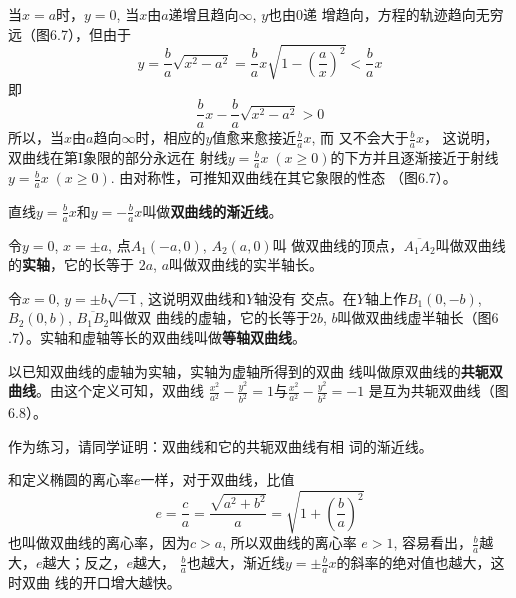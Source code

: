 当$x=a$时，$y=0$, 当$x$由$a$递增且趋向$\infty$, $y$也由0递
增趋向，方程的轨迹趋向无穷远（图6.7），但由于
\[y=\frac{b}{a}\sqrt{x^2-a^2}=\frac{b}{a}x\sqrt{1-\left(\frac{a}{x}\right)^2}<\frac{b}{a}x\]
即
\[\frac{b}{a}x-\frac{b}{a}\sqrt{x^2-a^2}>0\]
所以，当$x$由$a$趋向$\infty$时，相应的$y$值愈来愈接近$\frac{b}{a}x$, 而
又不会大于$\frac{b}{a}x$，
这说明，双曲线在第I象限的部分永远在
射线$y=\frac{b}{a}x\; (x\ge 0)$的下方并且逐渐接近于射线$y=\frac{b}{a}x\; (x\ge 0)$. 由对称性，可推知双曲线在其它象限的性态
（图6.7）。

直线$y=\frac{b}{a}x$和$y=-\frac{b}{a}x$叫做\textbf{双曲线的渐近线}。

令$y=0$, $x=\pm a$, 点$A_1(-a,0)$, $A_2(a,0)$叫
做双曲线的顶点，$\overline{A_1A_2}$叫做双曲线的\textbf{实轴}，它的长等于
$2a$, $a$叫做双曲线的实半轴长。

令$x=0$, $y=\pm b\sqrt{-1}$, 这说明双曲线和$Y$轴没有
交点。在$Y$轴上作$B_1(0,-b)$, $B_2(0,b)$, $\overline{B_1B_2}$叫做双
曲线的虚轴，它的长等于$2b$, $b$叫做双曲线虚半轴长（图6
.7）。实轴和虚轴等长的双曲线叫做\textbf{等轴双曲线}。

以已知双曲线的虚轴为实轴，实轴为虚轴所得到的双曲
线叫做原双曲线的\textbf{共轭双曲线}。由这个定义可知，双曲线
$\frac{x^2}{a^2}-\frac{y^2}{b^2}=1$与$\frac{x^2}{a^2}-\frac{y^2}{b^2}=-1$
是互为共轭双曲线（图6.8）。

作为练习，请同学证明：双曲线和它的共轭双曲线有相
词的渐近线。

\begin{figure}[htp]
    \centering
{}
    \caption{}
\end{figure}

和定义椭圆的离心率$e$一样，对于双曲线，比值
\[e=\frac{c}{a}=\frac{\sqrt{a^2+b^2}}{a}=\sqrt{1+\left(\frac{b}{a}\right)^2}\]
也叫做双曲线的离心率，因为$c>a$, 所以双曲线的离心率
$e>1$, 容易看出，$\frac{b}{a}$越大，$e$越大；反之，$e$越大，
$\frac{b}{a}$也越大，渐近线$y=\pm \frac{b}{a}x$的斜率的绝对值也越大，这时双曲
线的开口增大越快。


